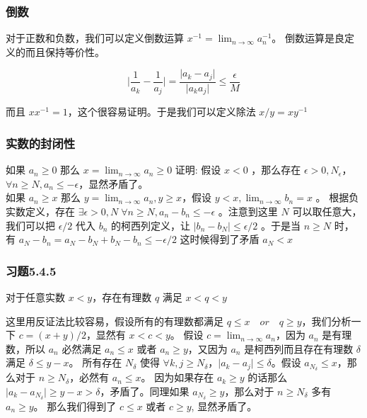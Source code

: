 \subsubsection{倒数}

对于正数和负数，我们可以定义倒数运算 $x^{-1} = \lim_{n \to \infty} a_n^{-1}$。
倒数运算是良定义的而且保持等价性。

\[
\lvert \frac{1}{a_k} - \frac{1}{a_j} \rvert = \frac{\lvert a_k - a_j \rvert}{\lvert a_ka_j \rvert} \le \frac{\epsilon}{M}
\]

而且 $xx^{-1} = 1$，这个很容易证明。于是我们可以定义除法 $x / y = xy^{-1}$

\subsubsection{实数的封闭性}
如果 $a_n \ge 0$ 那么 $x = \lim_{n \to \infty} a_n \ge 0$
证明: 假设 $x < 0$ ，那么存在 $\epsilon > 0 , N_{\epsilon}$，$\forall n \ge N, a_n \le -\epsilon $，显然矛盾了。\\

如果 $a_n \ge x$ 那么 $y = \lim_{n \to \infty} a_n, y \ge x$，假设 $y < x, \lim_{n \to \infty} b_n = x$ 。
根据负实数定义，存在 $ \exists \epsilon > 0, N \; \forall n \ge N,  a_n - b_n  \le -\epsilon $ 。注意到这里 $N$ 可以取任意大，
我们可以把 $ \epsilon / 2$ 代入 $b_n$ 的柯西列定义，让 $ \lvert b_n - b_N \rvert \le \epsilon /2$ 。于是当 $n \ge N$ 时，有 $a_N - b_n = a_N - b_N + b_N - b_n \le - \epsilon / 2$
这时候得到了矛盾 $a_N < x$


\subsubsection{习题5.4.5}

对于任意实数 $ x < y$，存在有理数 $q$ 满足 $x < q < y$

这里用反证法比较容易，假设所有的有理数都满足 $ q \le x \quad or \quad q \ge y $，我们分析一下 $c = (x+y)/2$，显然有 $x < c < y$。
假设 $ c = \lim_{n \to \infty}a_n$，因为 $a_n$ 是有理数，所以 $a_n$ 必然满足 $a_n \le x$ 或者 $a_n \ge y$，又因为 $a_n$ 是柯西列而且存在有理数 $\delta $ 满足 $\delta \le y-x$。
所有存在 $N_{\delta}$ 使得 $\forall k,j \ge N_{\delta}$，$\lvert a_k - a_j \rvert \le \delta $。假设 $a_{N_{\delta}} \le x$，那么对于 $n \ge N_{\delta}$，必然有 $a_n \le x$。
因为如果存在 $a_k \ge y$ 的话那么 $\lvert a_k - a_{N_\delta} \rvert \ge y -x > \delta $，矛盾了。同理如果 $a_{N_{\delta}} \ge y$，那么对于 $n \ge N_{\delta}$ 多有 $a_n \ge y$。
那么我们得到了 $ c \le x$ 或者 $c \ge y$, 显然矛盾了。

